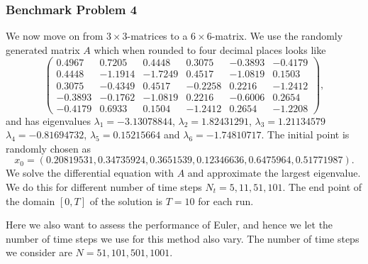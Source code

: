 \subsubsection{Benchmark Problem 4}\label{sec:benchmark problem 4}
We now move on from $3\times 3$-matrices to a $6\times 6$-matrix. We use the randomly generated matrix $A$ which when rounded to four decimal places looks like
\begin{equation}\label{eq:66mat1}
    \left(\begin{array}{cccccc}
        0.4967 & 0.7205 & 0.4448 &  0.3075 & -0.3893 & -0.4179 \\
        0.4448 & -1.1914 & -1.7249 & 0.4517 & -1.0819 & 0.1503 \\
        0.3075 & -0.4349 & 0.4517 & -0.2258 &  0.2216 & -1.2412 \\
        -0.3893 & -0.1762 & -1.0819 & 0.2216 & -0.6006 & 0.2654 \\
        -0.4179 & 0.6933 & 0.1504 & -1.2412 & 0.2654 & -1.2208
    \end{array}\right),
\end{equation}
and has eigenvalues $\lambda_1 = -3.13078844$, $\lambda_2=1.82431291$, $\lambda_3 = 1.21134579$ $\lambda_4=-0.81694732$,  $\lambda_5=0.15215664$ and $\lambda_6=-1.74810717$. The initial point is randomly chosen as
\begin{equation*}
    x_0 = (0.20819531, 0.34735924, 0.3651539,  0.12346636, 0.6475964,  0.51771987).
\end{equation*}
We solve the differential equation with $A$ and approximate the largest eigenvalue. We do this for different number of time steps $N_t=5, 11,51,101$. The end point of the domain $[0,T]$ of the solution is $T=10$ for each run.

Here we also want to assess the performance of Euler, and hence we let the number of time steps we use for this method also vary. The number of time steps we consider are $N=51,101,501,1001$.
